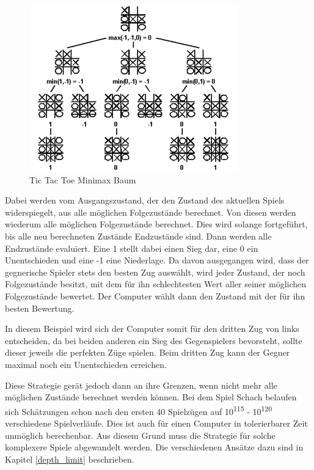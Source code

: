 \begin{figure}[h]
\centering
\includegraphics[width=\textwidth/5*3]{images/tictactoe_minimax_tree.png}

\caption{Tic Tac Toe Minimax Baum \cite{Kurenkov2019}}\label{fig:tictactoe_minimax_tree}
\end{figure}

Dabei werden vom Ausgangszustand, der den Zustand des aktuellen Spiels widerspiegelt, aus alle möglichen Folgezustände berechnet. Von diesen werden wiederum alle möglichen Folgezustände berechnet. Dies wird solange fortgeführt, bis alle neu berechneten Zustände Endzustände sind. Dann werden alle Endzustände evaluiert. Eine 1 stellt dabei einen Sieg dar, eine 0 ein Unentschieden und eine -1 eine Niederlage. Da davon ausgegangen wird, dass der gegnerische Spieler stets den besten Zug auswählt, wird jeder Zustand, der noch Folgezustände besitzt, mit dem für ihn schlechtesten Wert aller seiner möglichen Folgezustände bewertet. Der Computer wählt dann den Zustand mit der für ihn besten Bewertung. \cite{Russell2010}

In diesem Beispiel wird sich der Computer somit für den dritten Zug von links entscheiden, da bei beiden anderen ein Sieg des Gegenspielers bevorsteht, sollte dieser jeweils die perfekten Züge spielen. Beim dritten Zug kann der Gegner maximal noch ein Unentschieden erreichen.

Diese Strategie gerät jedoch dann an ihre Grenzen, wenn nicht mehr alle möglichen Zustände berechnet werden können. Bei dem Spiel Schach belaufen sich Schätzungen schon nach den ersten 40 Spielzügen auf 10\textsuperscript{115} - 10\textsuperscript{120} verschiedene Spielverläufe. \cite{Bonsdorff1978} Dies ist auch für einen Computer in tolerierbarer Zeit unmöglich berechenbar. Aus diesem Grund muss die Strategie für solche komplexere Spiele abgewandelt werden. Die verschiedenen Ansätze dazu sind in Kapitel \ref{depth_limit} beschrieben.

